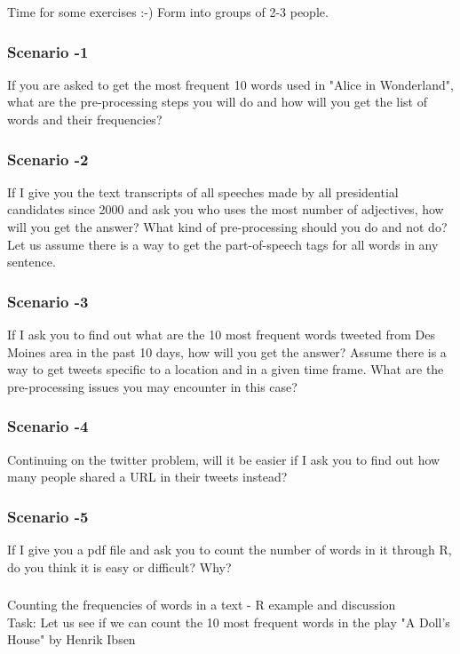 \documentclass{beamer}
\begin{document}
\begin{frame}
\Large Time for some exercises :-) Form into groups of 2-3 people. 
\end{frame}

\begin{frame}
\frametitle{Scenario -1}
If you are asked to get the most frequent 10 words used in "Alice in Wonderland", what are the pre-processing steps you will do and how will you get the list of words and their frequencies?
\end{frame}

\begin{frame}
\frametitle{Scenario -2}
If I give you the text transcripts of all speeches made by all presidential candidates since 2000 and ask you who uses the most number of adjectives, how will you get the answer? What kind of pre-processing should you do and not do? Let us assume there is a way to get the part-of-speech tags for all words in any sentence.
\end{frame}

\begin{frame}
\frametitle{Scenario -3}
If I ask you to find out what are the 10 most frequent words tweeted from Des Moines area in the past 10 days, how will you get the answer? Assume there is a way to get tweets specific to a location and in a given time frame. What are the pre-processing issues you may encounter in this case?
\end{frame}

\begin{frame}
\frametitle{Scenario -4}
Continuing on the twitter problem, will it be easier if I ask you to find out how many people shared a URL in their tweets instead?
\end{frame}

\begin{frame}
\frametitle{Scenario -5}
If I give you a pdf file and ask you to count the number of words in it through R, do you think it is easy or difficult? Why?
\end{frame}

\begin{frame}
\frametitle{}
\Large Counting the frequencies of words in a text - R example and discussion
\small \\ Task: Let us see if we can count the 10 most frequent words in the play "A Doll's House" by Henrik Ibsen
\end{frame}
\end{document}
